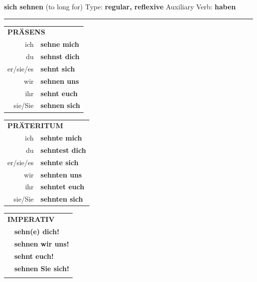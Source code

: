 \documentclass[10pt,a4paper]{revtex4-2}
\begin{document}
\begin{verbbox}
    {\Large \bf sich sehnen} (to long for) \hfill Type: \textbf{regular, reflexive} \hfill Auxiliary Verb: \textbf{haben} 
    
     \vspace{5pt}

    \hrule
    
    \vspace{5pt}

  \begin{tabular}{rl}
     \multicolumn{2}{l}{\textbf{PRÄSENS} }\\
    ich & \textbf{sehne mich}\\
    du & \textbf{sehnst dich}\\
    er/sie/es & \textbf{sehnt sich}\\
    wir & \textbf{sehnen uns}\\
    ihr & \textbf{sehnt euch}\\
    sie/Sie & \textbf{sehnen sich}\\
  \end{tabular}
  \hfill
     \begin{tabular}{rl}
    \multicolumn{2}{l}{\textbf{PRÄTERITUM} }\\
    ich & \textbf{sehnte mich}\\
    du & \textbf{sehntest dich}\\
    er/sie/es & \textbf{sehnte sich}\\
    wir & \textbf{sehnten uns}\\
    ihr & \textbf{sehntet euch}\\
    sie/Sie & \textbf{sehnten sich}\\
  \end{tabular}
  \hfill
  \begin{tabular}{rl}
     \multicolumn{2}{l}{\textbf{IMPERATIV} }\\
   & \textbf{sehn(e) dich!}\\
   & \textbf{sehnen wir uns!}\\
   & \textbf{sehnt euch!}\\
   & \textbf{sehnen Sie sich!}\\
   & \vspace{10pt}
  \end{tabular}

    \vspace{10pt}


\end{verbbox}
\end{document}
